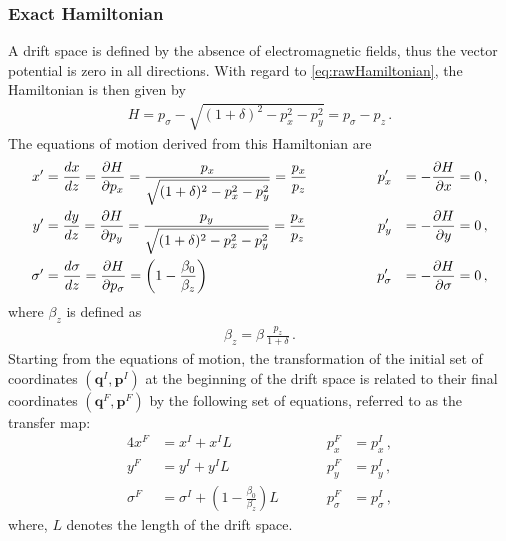 \subsubsection{Exact Hamiltonian}
A drift space is defined by the absence of electromagnetic fields, thus the vector potential is zero in all directions. With regard to \eqref{eq:rawHamiltonian}, the Hamiltonian is then given by
\begin{align}
H = p_\sigma - \sqrt{(1+\delta)^2 - p_x^2 -p_y^2}  = p_\sigma - p_z\, . \label{eq:full_H_drift}
\end{align}
The equations of motion derived from this Hamiltonian are
\begin{alignat}{4}
x' &= \frac{d x}{d z} = \frac{\partial H}{\partial p_x} = \frac{p_x}{ \sqrt{(1+\delta)^2 - p_x^2 -p_y^2} } = \frac{p_x}{p_z} \quad \quad \quad \quad &p_x' &&= -\frac{\partial H}{\partial x} = 0 \, , \\
y' &= \frac{d y}{d z} = \frac{\partial H}{\partial p_y} = \frac{p_y}{\sqrt{(1+\delta)^2 - p_x^2 -p_y^2}} = \frac{p_x}{p_z} \quad \quad &p_y' &&= -\frac{\partial H}{\partial y} = 0 \, , \\
\sigma' &=  \frac{d \sigma}{d z} = \frac{\partial H}{\partial p_\sigma} = \left( 1 - \frac{\beta_0}{\beta_z}  \right)     &p_\sigma' &&= -\frac{\partial H}{\partial \sigma} = 0 \, , 
\end{alignat}
where $\beta_z$ is defined as 
\begin{align}
\beta_z = \beta \, \frac{p_z}{1+\delta}\,.
\end{align}
%
Starting from the equations of motion, the transformation of the initial set of coordinates $(\mathbf{q}^I,\mathbf{p}^I)$ at the beginning of the drift space is related to their final coordinates $(\mathbf{q}^F,\mathbf{p}^F)$ by the following set of equations, referred to as the transfer map:
%
\begin{alignat}{4}
x^F & = x^I + x^{I}  L \quad \quad \quad \quad \quad \quad &p_x^F &= p_x^I \, , \\
y^F & = y^I + y^{I} L \quad \quad &p_y^F &= p_y^I \, , \\
\sigma^F & = \sigma^I + \left(1 - \frac{\beta_0}{\beta_z}\right) L \quad \quad &p_\sigma^F &= p_\sigma^I \, ,
\end{alignat}
%
where, $L$ denotes the length of the drift space.

